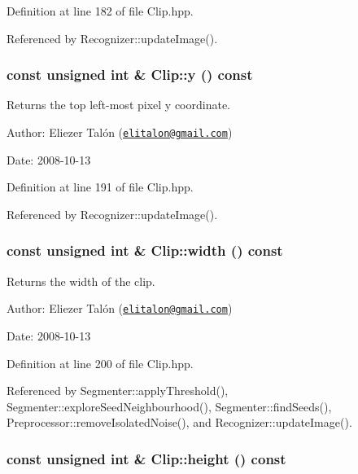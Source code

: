 Definition at line 182 of file Clip.hpp.

Referenced by Recognizer::updateImage().\hypertarget{class_clip_e06a2ad12ef2144a9d7d970b574c9c14}{
\subsubsection[y]{\setlength{\rightskip}{0pt plus 5cm}const unsigned int \& Clip::y () const}}
\label{class_clip_e06a2ad12ef2144a9d7d970b574c9c14}


Returns the top left-most pixel y coordinate. 

\begin{Desc}
\item[Author:]Eliezer Talón (\href{mailto:elitalon@gmail.com}{\tt elitalon@gmail.com}) \end{Desc}
\begin{Desc}
\item[Date:]2008-10-13 \end{Desc}


Definition at line 191 of file Clip.hpp.

Referenced by Recognizer::updateImage().\hypertarget{class_clip_88d1a47c0ec077e8c6680785509389b0}{
\subsubsection[width]{\setlength{\rightskip}{0pt plus 5cm}const unsigned int \& Clip::width () const}}
\label{class_clip_88d1a47c0ec077e8c6680785509389b0}


Returns the width of the clip. 

\begin{Desc}
\item[Author:]Eliezer Talón (\href{mailto:elitalon@gmail.com}{\tt elitalon@gmail.com}) \end{Desc}
\begin{Desc}
\item[Date:]2008-10-13 \end{Desc}


Definition at line 200 of file Clip.hpp.

Referenced by Segmenter::applyThreshold(), Segmenter::exploreSeedNeighbourhood(), Segmenter::findSeeds(), Preprocessor::removeIsolatedNoise(), and Recognizer::updateImage().\hypertarget{class_clip_939908a8dde602d25335792cc0fd5d97}{
\subsubsection[height]{\setlength{\rightskip}{0pt plus 5cm}const unsigned int \& Clip::height () const}}
\label{class_clip_939908a8dde602d25335792cc0fd5d97}


